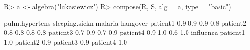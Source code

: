 \begin{Schunk}
% --begin: "comp.basic"
\begin{Sinput}
R> a <- algebra("lukasiewicz")
R> compose(R, S, alg = a, type = "basic")
\end{Sinput}
\begin{Soutput}
         pulm.hypertens sleeping.sickn malaria hangover
patient1            0.9            0.9     0.9      0.8
patient2            0.8            0.8     0.8      0.8
patient3            0.7            0.9     0.7      0.9
patient4            0.9            1.0     0.6      1.0
         influenza
patient1       1.0
patient2       0.9
patient3       0.9
patient4       1.0
\end{Soutput}
%
% --end: "comp.basic"
\end{Schunk}
